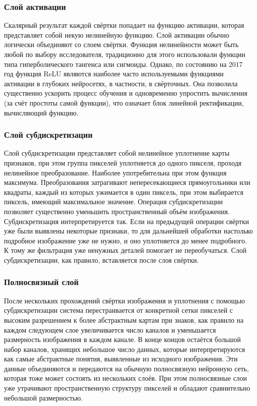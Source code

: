 \subsubsection{Слой активации}
Скалярный результат каждой свёртки попадает на функцию ак­тивации, которая представляет собой некую нелинейную функцию. Слой активации обычно логически объединяют со слоем свёртки. Функция нелинейности может быть любой по выбору исследователя, тради­ционно для этого использовали функции типа гиперболического тангенса или сигмоиды. Однако, по состоянию на 2017 год функция ReLU являются наиболее часто используемыми функциями активации в глу­боких нейросетях, в частности, в свёрточных. Она позво­лила существенно ускорить процесс обучения и одновременно упро­стить вычисления (за счёт простоты самой функции), что означа­ет блок линейной ректификации, вычисляющий функцию. 

\subsubsection{Слой субдискретизации}

Слой субдискретизации представ­ляет собой нелинейное уплотнение карты признаков, при этом группа пикселей уплотняется до одного пикселя, про­ходя нелинейное преобразование. Наиболее употребительна при этом функция максимума. Преобразования затрагивают непересекающие­ся прямоугольники или квадраты, каждый из которых ужимается в один пиксель, при этом выбирается пиксель, имеющий максимальное значение. Операция субдискретизации позволяет существенно уменьшить пространственный объём изображения. Субдискретизация интерпретируется так. Ес­ли на предыдущей операции свёртки уже были выявлены некоторые признаки, то для дальнейшей обработки настолько подробное изоб­ражение уже не нужно, и оно уплотняется до менее подробного. К тому же фильтрация уже ненужных деталей помогает не переобучать­ся. Слой субдискретизации, как правило, вставляется после слоя свёртки.

\subsubsection{Полносвязный слой}
После нескольких прохождений свёртки изображения и уплотне­ния с помощью субдискретизации система перестраивается от конкретной сетки пикселей с высоким разрешением к более абстрактным картам при­ знаков, как правило на каждом следующем слое увеличивается число каналов и уменьшается размерность изображения в каждом канале. В конце концов остаётся большой набор каналов, хранящих небольшое число данных, которые интерпретируются как самые абстрактные понятия, выявленные из исходного изображения.
Эти данные объединяются и передаются на обычную полносвяз­ную нейронную сеть, которая тоже может состоять из нескольких сло­ёв. При этом полносвязные слои уже утрачивают пространственную структуру пикселей и обладают сравнительно небольшой размерно­стью.




